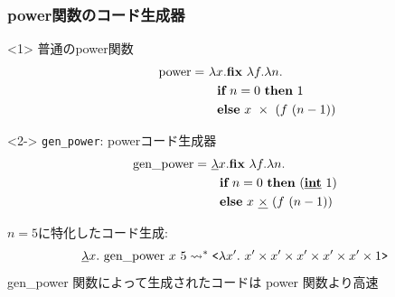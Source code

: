 \begin{frame}
  \frametitle{power関数のコード生成器}
  \begin{onlyenv}<1>
    普通のpower関数
    \begin{align*}
      \text{~~~~~~power} =~ &\lambda x. \textbf{fix}~ \lambda f. \lambda n. \\
                            &~~\textbf{if}~ n=0~ \textbf{then}~  1 \\
                            &~~\textbf{else}~ x~ \times~ (f~ (n - 1))
    \end{align*}
  \end{onlyenv}

  \begin{onlyenv}<2->
    \texttt{gen\_power}: powerコード生成器
    \begin{align*}
      \text{gen\_power} =~ &\underline{\lambda} x. \textbf{fix}~ \lambda f. \lambda n. \\
                           &~~\textbf{if}~ n=0~ \textbf{then}~ (\underline{\textbf{int}}~ 1) \\
                           &~~\textbf{else}~ x~ \underline{\textbf{$\times$}}~ (f~ (n - 1))
    \end{align*}
  \end{onlyenv}

  \pause
  \pause
  $n = 5$に特化したコード生成:
  \pause
  \begin{align*}
    \underline{\lambda}{x}.{~\text{gen\_power}~ x~ 5} \leadsto^* \texttt{<}{\lambda{x'}.{~x'
    \times x' \times x' \times x' \times x' \times 1}}\texttt{>}
  \end{align*}
  \pause
  gen\_power 関数によって生成されたコードは power 関数より高速
\end{frame}




%

